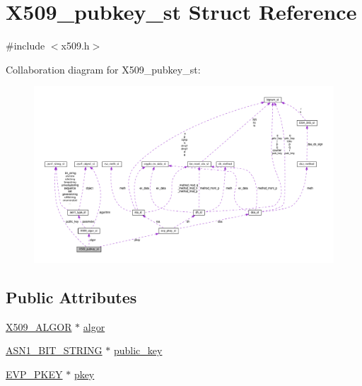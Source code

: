 \hypertarget{struct_x509__pubkey__st}{}\section{X509\+\_\+pubkey\+\_\+st Struct Reference}
\label{struct_x509__pubkey__st}


{\ttfamily \#include $<$x509.\+h$>$}



Collaboration diagram for X509\+\_\+pubkey\+\_\+st\+:
\nopagebreak
\begin{figure}[H]
\begin{center}
\leavevmode
\includegraphics[width=350pt]{struct_x509__pubkey__st__coll__graph}
\end{center}
\end{figure}
\subsection*{Public Attributes}
\begin{DoxyCompactItemize}
\item 
\hyperlink{ossl__typ_8h_aa2b6185e6254f36f709cd6577fb5022e}{X509\+\_\+\+A\+L\+G\+OR} $\ast$ \hyperlink{struct_x509__pubkey__st_a0fb9c56d9396c7fffdb67e9c758be102}{algor}
\item 
\hyperlink{ossl__typ_8h_af837aaa00e151b1e8773aea5a8fe1cc4}{A\+S\+N1\+\_\+\+B\+I\+T\+\_\+\+S\+T\+R\+I\+NG} $\ast$ \hyperlink{struct_x509__pubkey__st_ae2fae3c3fa6b2d0a28b5873da1361250}{public\+\_\+key}
\item 
\hyperlink{ossl__typ_8h_a2fca4fef9e4c7a2a739b1ea04acb56ce}{E\+V\+P\+\_\+\+P\+K\+EY} $\ast$ \hyperlink{struct_x509__pubkey__st_a3ffae0e6f6a9c34c52339de00d8a8234}{pkey}
\end{DoxyCompactItemize}


